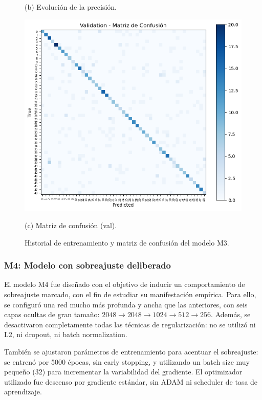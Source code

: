 \documentclass[11pt]{article}
\begin{document}
\begin{figure}[H]
\begin{minipage}[t]{0.32\textwidth}
        \caption*{(b) Evolución de la precisión.}
    \end{minipage}
    \hfill
    \begin{minipage}[t]{0.32\textwidth}
        \centering
        \includegraphics[width=\linewidth]{figures/conf_matrix_m3.png}
        \caption*{(c) Matriz de confusión (val).}
    \end{minipage}
    \caption{Historial de entrenamiento y matriz de confusión del modelo M3.}
    \label{fig:plots-m3}
\end{figure}

\subsubsection*{M4: Modelo con sobreajuste deliberado}

El modelo M4 fue diseñado con el objetivo de inducir un comportamiento de sobreajuste marcado, con el fin de estudiar su manifestación empírica. Para ello, se configuró una red mucho más profunda y ancha que las anteriores, con seis capas ocultas de gran tamaño: \(2048 \rightarrow 2048 \rightarrow 1024 \rightarrow 512 \rightarrow 256\). Además, se desactivaron completamente todas las técnicas de regularización: no se utilizó ni L2, ni dropout, ni batch normalization.

También se ajustaron parámetros de entrenamiento para acentuar el sobreajuste: se entrenó por 5000 épocas, sin early stopping, y utilizando un batch size muy pequeño (32) para incrementar la variabilidad del gradiente. El optimizador utilizado fue descenso por gradiente estándar, sin ADAM ni scheduler de tasa de aprendizaje.
\end{document}
